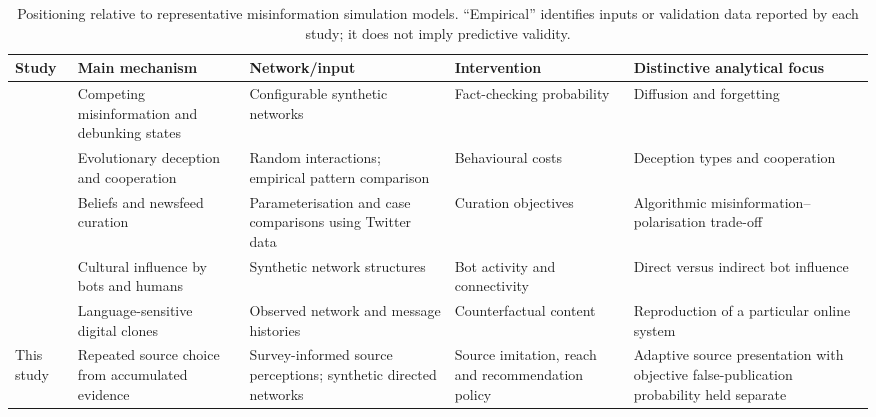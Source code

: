 \begin{table}[ht]
\centering
\caption{Positioning relative to representative misinformation simulation models. ``Empirical'' identifies inputs or validation data reported by each study; it does not imply predictive validity.}
\label{tab:related-models}
\small
\begin{tabular}{p{2.5cm}p{2.8cm}p{2.6cm}p{2.5cm}p{3.4cm}}
\toprule
Study & Main mechanism & Network/input & Intervention & Distinctive analytical focus \\
\midrule
\citet{sulis2020} & Competing misinformation and debunking states & Configurable synthetic networks & Fact-checking probability & Diffusion and forgetting \\
\citet{hills2018} & Evolutionary deception and cooperation & Random interactions; empirical pattern comparison & Behavioural costs & Deception types and cooperation \\
\citet{gausen2022} & Beliefs and newsfeed curation & Parameterisation and case comparisons using Twitter data & Curation objectives & Algorithmic misinformation--polarisation trade-off \\
\citet{keijzer2021} & Cultural influence by bots and humans & Synthetic network structures & Bot activity and connectivity & Direct versus indirect bot influence \\
\citet{puri2024} & Language-sensitive digital clones & Observed network and message histories & Counterfactual content & Reproduction of a particular online system \\
This study & Repeated source choice from accumulated evidence & Survey-informed source perceptions; synthetic directed networks & Source imitation, reach and recommendation policy & Adaptive source presentation with objective false-publication probability held separate \\
\bottomrule
\end{tabular}
\end{table}
